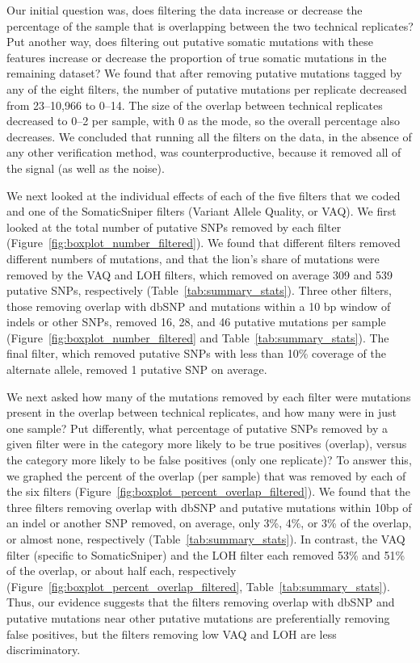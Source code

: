 \documentclass[11pt]{article} %
\begin{document}
Our initial question was, does filtering the data increase or decrease the percentage of the sample that is overlapping between the two technical replicates? Put another way, does filtering out putative somatic mutations with these features increase or decrease the proportion of true somatic mutations in the remaining dataset? We found that after removing putative mutations tagged by any of the eight filters, the number of putative mutations per replicate decreased from 23--10,966 to 0--14. The size of the overlap between technical replicates decreased to 0--2 per sample, with 0 as the mode, so the overall percentage also decreases. We concluded that running all the filters on the data, in the absence of any other verification method, was counterproductive, because it removed all of the signal (as well as the noise). 

We next looked at the individual effects of each of the five filters that we coded and one of the SomaticSniper filters (Variant Allele Quality, or VAQ). We first looked at the total number of putative SNPs removed by each filter (Figure~\ref{fig:boxplot_number_filtered}). We found that different filters removed different numbers of mutations, and that the lion's share of mutations were removed by the VAQ and LOH filters, which removed on average 309 and 539 putative SNPs, respectively (Table~\ref{tab:summary_stats}). Three other filters, those removing overlap with dbSNP and mutations within a 10 bp window of indels or other SNPs, removed 16, 28, and 46 putative mutations per sample (Figure~\ref{fig:boxplot_number_filtered} and Table~\ref{tab:summary_stats}). The final filter, which removed putative SNPs with less than 10\% coverage of the alternate allele, removed 1 putative SNP on average. 

We next asked how many of the mutations removed by each filter were mutations present in the overlap between technical replicates, and how many were in just one sample? Put differently, what percentage of putative SNPs removed by a given filter were in the category more likely to be true positives (overlap), versus the category more likely to be false positives (only one replicate)? To answer this, we graphed the percent of the overlap (per sample) that was removed by each of the six filters (Figure~\ref{fig:boxplot_percent_overlap_filtered}). We found that the three filters removing overlap with dbSNP and putative mutations within 10bp of an indel or another SNP removed, on average, only 3\%, 4\%, or 3\% of the overlap, or almost none, respectively (Table~\ref{tab:summary_stats}). In contrast, the VAQ filter (specific to SomaticSniper) and the LOH filter each removed 53\% and 51\% of the overlap, or about half each, respectively (Figure~\ref{fig:boxplot_percent_overlap_filtered}, Table~\ref{tab:summary_stats}). Thus, our evidence suggests that the filters removing overlap with dbSNP and putative mutations near other putative mutations are preferentially removing false positives, but the filters removing low VAQ and LOH are less discriminatory. 
\end{document}
